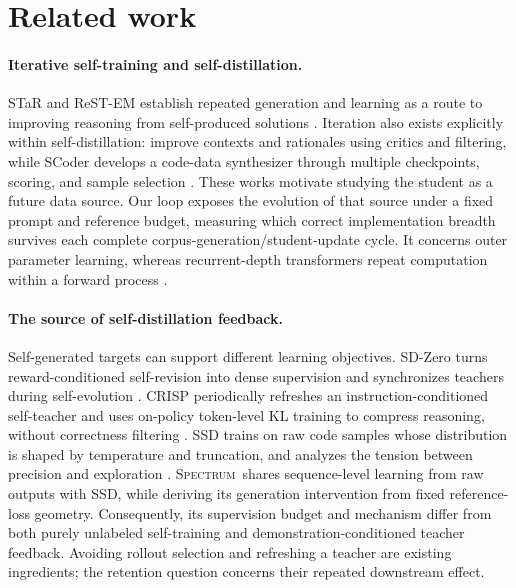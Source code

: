 \documentclass{article}
\newcommand{\method}{\textsc{Spectrum}}
\begin{document}
\section{Related work}
\label{sec:related}
\paragraph{Iterative self-training and self-distillation.}
STaR and ReST-EM establish repeated generation and learning as a route to improving reasoning from self-produced solutions \citep{zelikman2022star,singh2024restem}. Iteration also exists explicitly within self-distillation: \citet{rao2023iterative} improve contexts and rationales using critics and filtering, while SCoder develops a code-data synthesizer through multiple checkpoints, scoring, and sample selection \citep{zhang2025scoder}. These works motivate studying the student as a future data source. Our loop exposes the evolution of that source under a fixed prompt and reference budget, measuring which correct implementation breadth survives each complete corpus-generation/student-update cycle. It concerns outer parameter learning, whereas recurrent-depth transformers repeat computation within a forward process \citep{dehghani2019universal}.

\paragraph{The source of self-distillation feedback.}
Self-generated targets can support different learning objectives. SD-Zero turns reward-conditioned self-revision into dense supervision and synchronizes teachers during self-evolution \citep{he2026sdzero}. CRISP periodically refreshes an instruction-conditioned self-teacher and uses on-policy token-level KL training to compress reasoning, without correctness filtering \citep{sang2026crisp}. SSD trains on raw code samples whose distribution is shaped by temperature and truncation, and analyzes the tension between precision and exploration \citep{zhang2026ssd}. \method\ shares sequence-level learning from raw outputs with SSD, while deriving its generation intervention from fixed reference-loss geometry. Consequently, its supervision budget and mechanism differ from both purely unlabeled self-training and demonstration-conditioned teacher feedback. Avoiding rollout selection and refreshing a teacher are existing ingredients; the retention question concerns their repeated downstream effect.
\end{document}
